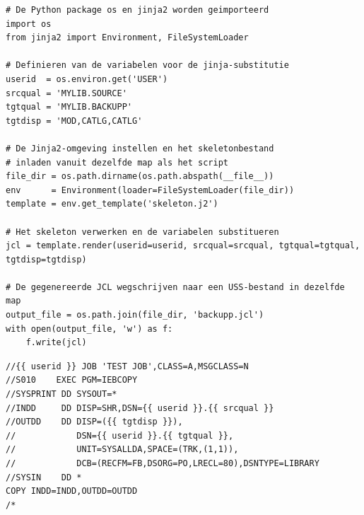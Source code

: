 \begin{verbatim}
# De Python package os en jinja2 worden geimporteerd
import os
from jinja2 import Environment, FileSystemLoader

# Definieren van de variabelen voor de jinja-substitutie
userid  = os.environ.get('USER')
srcqual = 'MYLIB.SOURCE'
tgtqual = 'MYLIB.BACKUPP'
tgtdisp = 'MOD,CATLG,CATLG'

# De Jinja2-omgeving instellen en het skeletonbestand
# inladen vanuit dezelfde map als het script
file_dir = os.path.dirname(os.path.abspath(__file__))
env      = Environment(loader=FileSystemLoader(file_dir))
template = env.get_template('skeleton.j2')

# Het skeleton verwerken en de variabelen substitueren
jcl = template.render(userid=userid, srcqual=srcqual, tgtqual=tgtqual, tgtdisp=tgtdisp)

# De gegenereerde JCL wegschrijven naar een USS-bestand in dezelfde map
output_file = os.path.join(file_dir, 'backupp.jcl')
with open(output_file, 'w') as f:
    f.write(jcl)
\end{verbatim}



\begin{verbatim}
//{{ userid }} JOB 'TEST JOB',CLASS=A,MSGCLASS=N
//S010    EXEC PGM=IEBCOPY
//SYSPRINT DD SYSOUT=*
//INDD     DD DISP=SHR,DSN={{ userid }}.{{ srcqual }}
//OUTDD    DD DISP=({{ tgtdisp }}),
//            DSN={{ userid }}.{{ tgtqual }},
//            UNIT=SYSALLDA,SPACE=(TRK,(1,1)),
//            DCB=(RECFM=FB,DSORG=PO,LRECL=80),DSNTYPE=LIBRARY
//SYSIN    DD *
COPY INDD=INDD,OUTDD=OUTDD
/*
\end{verbatim}



